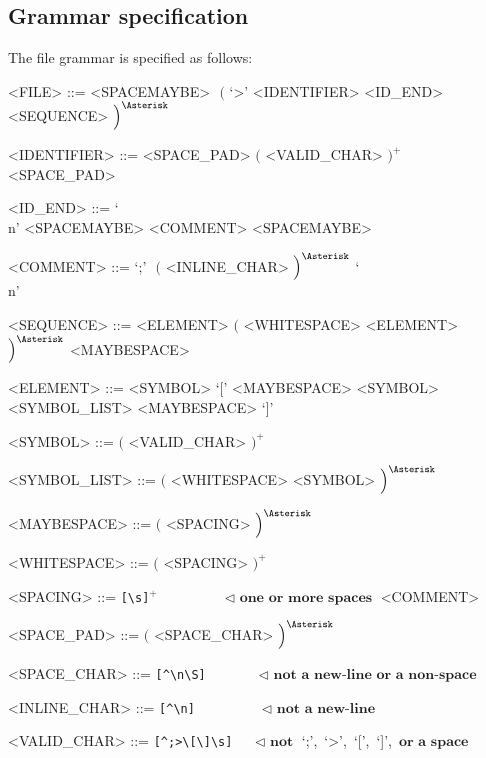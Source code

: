 \documentclass[12pt]{article}
\begin{document}
\subsection{Grammar specification}
The file grammar is specified as follows:

\setlength{\grammarindent}{10em} %

\begin{grammar}

  <FILE>         ::=  <SPACEMAYBE> $\,\,\Big($ `>' <IDENTIFIER> <ID_END> <SEQUENCE> $\Big)^{\Asterisk}$

  <IDENTIFIER>   ::=  <SPACE_PAD> $\Big($ <VALID_CHAR> $\Big)^{+}$ <SPACE_PAD>

  <ID_END>       ::=  `\\n' <SPACEMAYBE>
                 \alt <COMMENT> <SPACEMAYBE>

  <COMMENT>      ::=  `;' $\,\,\Big($ <INLINE_CHAR> $\Big)^{\Asterisk}$ `\\n'

  <SEQUENCE>     ::=  <ELEMENT> $\Big($ <WHITESPACE> <ELEMENT> $\Big)^{\Asterisk}$ <MAYBESPACE>
  
  <ELEMENT>      ::=  <SYMBOL>
                 \alt `[' <MAYBESPACE> <SYMBOL> <SYMBOL_LIST> <MAYBESPACE> `]'
 
  <SYMBOL>       ::=  $\Big($ <VALID_CHAR> $\Big)^{+}$
                 
  <SYMBOL_LIST>  ::=  $\Big($ <WHITESPACE> <SYMBOL> $\Big)^{\Asterisk}$
  
  <MAYBESPACE>   ::=  $\Big($ <SPACING> $\Big)^{\Asterisk}$

  <WHITESPACE>   ::=  $\Big($ <SPACING>  $\Big)^{+}$

  <SPACING>      ::=  \verb![\s]!$^{+}$  $\quad\,\quad\quad\quad \lhd \,\, \textbf{one or more spaces}$
                 \alt <COMMENT>

  <SPACE_PAD>    ::=  $\Big($ <SPACE_CHAR> $\Big)^{\Asterisk}$

  <SPACE_CHAR>   ::=  \verb![^\n\S]!     $\quad\,\quad\quad      \lhd \,\, \textbf{not a new-line or a non-space}$

  <INLINE_CHAR>  ::=  \verb![^\n]!       $\quad\,\quad\quad\quad \lhd \,\, \textbf{not a new-line}$

  <VALID_CHAR>   ::=  \verb![^;>\[\]\s]! $\quad                  \lhd \,\, \textbf{not}$ `;',$\,$ `>',$\,$ `[',$\,$ `]', $\,\textbf{or a space}$


  
\end{grammar}
\end{document}
